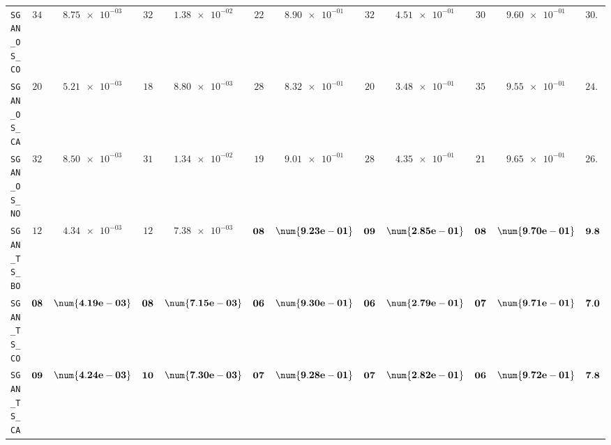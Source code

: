 \begin{table}[H]
\begin{tabularx}{\textwidth}{l||cC|cC|cC|cC|cC||c}
		\texttt{SGAN\_OS\_CO} & $ 34$ & $ \num{8.75e-03}$ & $ 32$ & $ \num{1.38e-02}$ & $ 22$ & $ \num{8.90e-01}$ & $ 32$ & $ \num{4.51e-01}$ & $ 30$ & $ \num{9.60e-01}$ & $ 30.0$  \\
		\texttt{SGAN\_OS\_CA} & $ 20$ & $ \num{5.21e-03}$ & $ 18$ & $ \num{8.80e-03}$ & $ 28$ & $ \num{8.32e-01}$ & $ 20$ & $ \num{3.48e-01}$ & $ 35$ & $ \num{9.55e-01}$ & $ 24.2$  \\
		\texttt{SGAN\_OS\_NO} & $ 32$ & $ \num{8.50e-03}$ & $ 31$ & $ \num{1.34e-02}$ & $ 19$ & $ \num{9.01e-01}$ & $ 28$ & $ \num{4.35e-01}$ & $ 21$ & $ \num{9.65e-01}$ & $ 26.2$  \\
		\texttt{SGAN\_TS\_BO} & $ 12$ & $ \num{4.34e-03}$ & $ 12$ & $ \num{7.38e-03}$ & $\bf 08$ & $\bf \num{9.23e-01}$ & $\bf 09$ & $\bf \num{2.85e-01}$ & $\bf 08$ & $\bf \num{9.70e-01}$ & $\bf 9.8$  \\
		\texttt{SGAN\_TS\_CO} & $\bf 08$ & $\bf \num{4.19e-03}$ & $\bf 08$ & $\bf \num{7.15e-03}$ & $\bf 06$ & $\bf \num{9.30e-01}$ & $\bf 06$ & $\bf \num{2.79e-01}$ & $\bf 07$ & $\bf \num{9.71e-01}$ & $\bf 7.0$  \\
		\texttt{SGAN\_TS\_CA} & $\bf 09$ & $\bf \num{4.24e-03}$ & $\bf 10$ & $\bf \num{7.30e-03}$ & $\bf 07$ & $\bf \num{9.28e-01}$ & $\bf 07$ & $\bf \num{2.82e-01}$ & $\bf 06$ & $\bf \num{9.72e-01}$ & $\bf 7.8$  \\

\end{tabularx}
\end{table}
